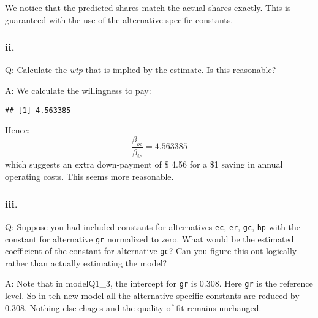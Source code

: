 \documentclass[
]{article}
\newenvironment{Shaded}{\begin{snugshade}}{\end{snugshade}}
\newcommand{\DecValTok}[1]{\textcolor[rgb]{0.00,0.00,0.81}{#1}}
\newcommand{\KeywordTok}[1]{\textcolor[rgb]{0.13,0.29,0.53}{\textbf{#1}}}
\newcommand{\NormalTok}[1]{#1}
\newcommand{\OperatorTok}[1]{\textcolor[rgb]{0.81,0.36,0.00}{\textbf{#1}}}
\newcommand{\StringTok}[1]{\textcolor[rgb]{0.31,0.60,0.02}{#1}}
\begin{document}
We notice that the predicted shares match the actual shares exactly.
This is guaranteed with the use of the alternative specific constants.

\hypertarget{ii.-1}{%
\subsubsection{ii.}\label{ii.-1}}

Q: Calculate the \emph{wtp} that is implied by the estimate. Is this
reasonable?

A: We calculate the willingness to pay:

\begin{Shaded}
\end{Shaded}

\begin{verbatim}
## [1] 4.563385
\end{verbatim}

Hence: \begin{equation*}
\frac{\beta_{oc}}{\beta_{ic}}=4.563385
\end{equation*} which suggests an extra down-payment of \$ 4.56 for a
\$1 saving in annual operating costs. This seems more reasonable.

\hypertarget{iii.-1}{%
\subsubsection{iii.}\label{iii.-1}}

Q: Suppose you had included constants for alternatives \texttt{ec},
\texttt{er}, \texttt{gc}, \texttt{hp} with the constant for alternative
\texttt{gr} normalized to zero. What would be the estimated coefficient
of the constant for alternative \texttt{gc}? Can you figure this out
logically rather than actually estimating the model?


A: Note that in modelQ1\_3, the intercept for \texttt{gr} is 0.308. Here
\texttt{gr} is the reference level. So in teh new model all the
alternative specific constants are reduced by 0.308. Nothing else chages
and the quality of fit remains unchanged.
\end{document}
